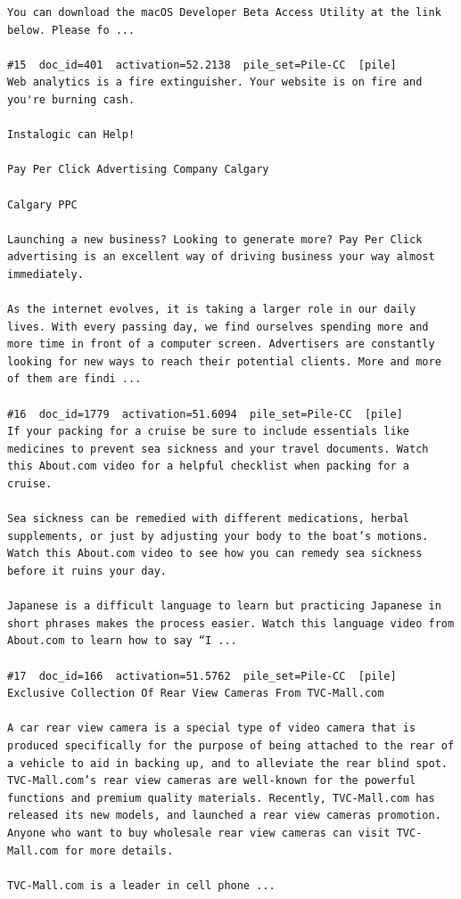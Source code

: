 \begin{verbatim}
You can download the macOS Developer Beta Access Utility at the link below. Please fo ...

#15  doc_id=401  activation=52.2138  pile_set=Pile-CC  [pile]
Web analytics is a fire extinguisher. Your website is on fire and you're burning cash.

Instalogic can Help!

Pay Per Click Advertising Company Calgary

Calgary PPC

Launching a new business? Looking to generate more? Pay Per Click advertising is an excellent way of driving business your way almost immediately.

As the internet evolves, it is taking a larger role in our daily lives. With every passing day, we find ourselves spending more and more time in front of a computer screen. Advertisers are constantly looking for new ways to reach their potential clients. More and more of them are findi ...

#16  doc_id=1779  activation=51.6094  pile_set=Pile-CC  [pile]
If your packing for a cruise be sure to include essentials like medicines to prevent sea sickness and your travel documents. Watch this About.com video for a helpful checklist when packing for a cruise.

Sea sickness can be remedied with different medications, herbal supplements, or just by adjusting your body to the boat’s motions. Watch this About.com video to see how you can remedy sea sickness before it ruins your day.

Japanese is a difficult language to learn but practicing Japanese in short phrases makes the process easier. Watch this language video from About.com to learn how to say “I ...

#17  doc_id=166  activation=51.5762  pile_set=Pile-CC  [pile]
Exclusive Collection Of Rear View Cameras From TVC-Mall.com

A car rear view camera is a special type of video camera that is produced specifically for the purpose of being attached to the rear of a vehicle to aid in backing up, and to alleviate the rear blind spot. TVC-Mall.com’s rear view cameras are well-known for the powerful functions and premium quality materials. Recently, TVC-Mall.com has released its new models, and launched a rear view cameras promotion. Anyone who want to buy wholesale rear view cameras can visit TVC-Mall.com for more details.

TVC-Mall.com is a leader in cell phone ...


\end{verbatim}
